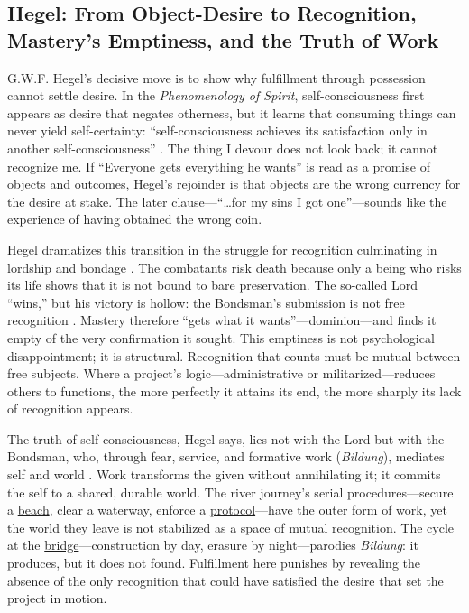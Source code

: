 \subsection*{Hegel: From Object-Desire to Recognition, Mastery's Emptiness, and the Truth of
	Work}
\label{ssec:iii-hegel}
G.W.F. Hegel's decisive move is to show why fulfillment through possession cannot settle
desire. In the \emph{Phenomenology of Spirit}, self-consciousness first appears as desire that
negates
otherness, but it learns that consuming things can never yield self-certainty:
``self-consciousness achieves its satisfaction only in another self-consciousness''
\parencite[\S 175]{HegelPhenomenology1977}. The thing I devour does not look back; it cannot
recognize me. If ``Everyone gets everything he wants'' is read as a promise of objects and
outcomes, Hegel's rejoinder is that objects are the wrong currency for the desire at stake.
The later clause—``\ldots for my sins I got one''—sounds like the experience of having obtained
the wrong coin.

Hegel dramatizes this transition in the struggle for recognition culminating in lordship and
bondage \parencite[\S\S 178--196]{HegelPhenomenology1977}. The combatants risk death because
only a being who risks its life shows that it is not bound to bare preservation. The so-called
Lord ``wins,'' but his victory is hollow: the Bondsman's submission is not free recognition
\parencite[\S\S 187--189]{HegelPhenomenology1977}. Mastery therefore ``gets what it
wants''—dominion—and
finds it empty of the very confirmation it sought. This emptiness is not psychological
disappointment; it is structural. Recognition that counts must be mutual between free subjects.
Where a project's logic—administrative or militarized—reduces others to functions, the more
perfectly it attains its end, the more sharply its lack of recognition appears.

The truth of self-consciousness, Hegel says, lies not with the Lord but with the Bondsman, who,
through fear, service, and formative work (\emph{Bildung}), mediates self and world
\parencite[\S 196]{HegelPhenomenology1977}. Work transforms the given without annihilating it;
it commits the self to a shared, durable world. The river journey's serial procedures—secure a
\hyperref[scene:kilgore-beach]{beach}, clear a waterway, enforce a
\hyperref[scene:sampan]{protocol}—have the outer form of work, yet the world they leave is not
stabilized as a space of mutual recognition. The cycle at the
\hyperref[scene:do-lung-bridge]{bridge}—construction by day, erasure by night—parodies
\emph{Bildung}: it produces, but it does not found.
Fulfillment here punishes by revealing the absence of the only recognition that could have
satisfied the desire that set the project in motion.

